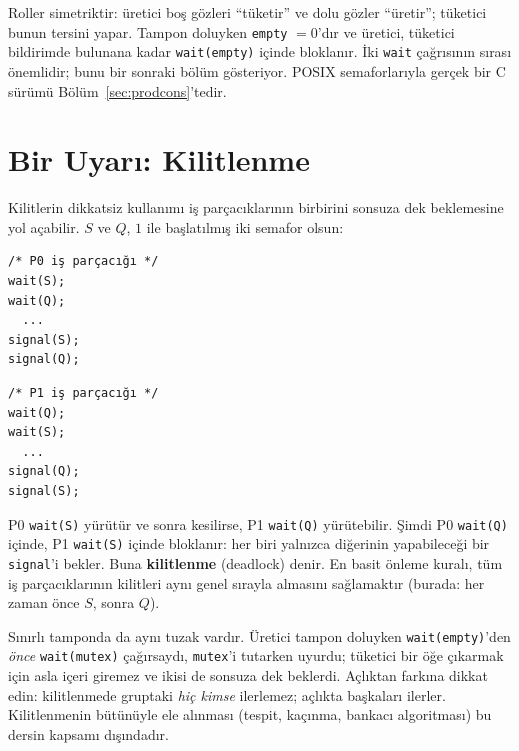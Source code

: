 \documentclass[11pt,a4paper]{article}
\newcommand{\term}[1]{\textbf{\color{mintdeep}#1}}
\begin{document}
Roller simetriktir: üretici boş gözleri ``tüketir'' ve dolu gözler ``üretir''; tüketici bunun tersini yapar. Tampon doluyken \texttt{empty} $=0$'dır ve üretici, tüketici bildirimde bulunana kadar \texttt{wait(empty)} içinde bloklanır. İki \texttt{wait} çağrısının sırası önemlidir; bunu bir sonraki bölüm gösteriyor. POSIX semaforlarıyla gerçek bir C sürümü Bölüm~\ref{sec:prodcons}'tedir.

\section{Bir Uyarı: Kilitlenme}

Kilitlerin dikkatsiz kullanımı iş parçacıklarının birbirini sonsuza dek beklemesine yol açabilir. $S$ ve $Q$, $1$ ile başlatılmış iki semafor olsun:

\begin{center}
\begin{minipage}[t]{0.3\linewidth}
\begin{lstlisting}[numbers=none]
/* P0 iş parçacığı */
wait(S);
wait(Q);
  ...
signal(S);
signal(Q);
\end{lstlisting}
\end{minipage}\qquad
\begin{minipage}[t]{0.3\linewidth}
\begin{lstlisting}[numbers=none]
/* P1 iş parçacığı */
wait(Q);
wait(S);
  ...
signal(Q);
signal(S);
\end{lstlisting}
\end{minipage}
\end{center}

P0 \texttt{wait(S)} yürütür ve sonra kesilirse, P1 \texttt{wait(Q)} yürütebilir. Şimdi P0 \texttt{wait(Q)} içinde, P1 \texttt{wait(S)} içinde bloklanır: her biri yalnızca diğerinin yapabileceği bir \texttt{signal}'i bekler. Buna \term{kilitlenme} (deadlock) denir. En basit önleme kuralı, tüm iş parçacıklarının kilitleri aynı genel sırayla almasını sağlamaktır (burada: her zaman önce $S$, sonra $Q$).

Sınırlı tamponda da aynı tuzak vardır. Üretici tampon doluyken \texttt{wait(empty)}'den \emph{önce} \texttt{wait(mutex)} çağırsaydı, \texttt{mutex}'i tutarken uyurdu; tüketici bir öğe çıkarmak için asla içeri giremez ve ikisi de sonsuza dek beklerdi. Açlıktan farkına dikkat edin: kilitlenmede gruptaki \emph{hiç kimse} ilerlemez; açlıkta başkaları ilerler. Kilitlenmenin bütünüyle ele alınması (tespit, kaçınma, bankacı algoritması) bu dersin kapsamı dışındadır.
\end{document}
